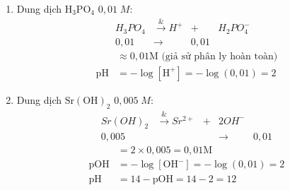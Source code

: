 \begin{bt}
{\begin{enumerate}
\begin{align*}
			\end{align*}
			\item Dung dịch $\mathrm{H_3PO_4}$ $0,01\;M$:
			\[\begin{array}{ccccc}
				H_3PO_4& \xrightarrow& H^+&+& H_2PO_4^-\\
				0{,}01&\rightarrow&0{,}01& &
			\end{array}\]
			\begin{align*}
				[\mathrm{H^+}] &\approx 0,01 \mathrm{M} \text{ (giả sử phân ly hoàn toàn)} \\
				\mathrm{pH} &= -\log[\mathrm{H^+}] = -\log(0,01) = 2
			\end{align*}
			\item Dung dịch $\mathrm{Sr{(OH)}_2}$ $0,005\;M$:
			\[\begin{array}{ccccc}
				Sr(OH)_2& \xrightarrow& Sr^{2+}&+& 2OH^-\\
				0{,}005&&&\rightarrow &0{,}01
			\end{array}\]
			\begin{align*}
				[\mathrm{OH^-}] &= 2 \times 0,005 = 0,01 \mathrm{M} \\
				\mathrm{pOH} &= -\log[\mathrm{OH^-}] = -\log(0,01) = 2 \\
				\mathrm{pH} &= 14 - \mathrm{pOH} = 14 - 2 = 12
			\end{align*}
		\end{enumerate}
	}
\end{bt}

